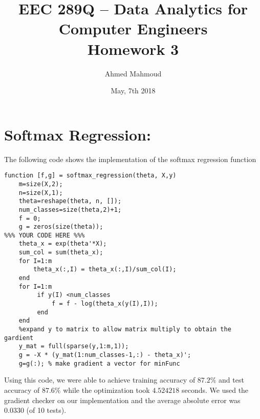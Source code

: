 \documentclass[12pt] {article}
\begin{document}
\title{EEC 289Q – Data Analytics for Computer Engineers \\ Homework 3}
\author{Ahmed Mahmoud}
\date{May, 7th 2018} 

\maketitle






\section*{Softmax Regression:} 
The following code shows the implementation of the softmax regression function
\begin{lstlisting}
function [f,g] = softmax_regression(theta, X,y) 
	m=size(X,2);
	n=size(X,1);
	theta=reshape(theta, n, []);
	num_classes=size(theta,2)+1;
	f = 0;
	g = zeros(size(theta));
%%% YOUR CODE HERE %%%
	theta_x = exp(theta'*X);
	sum_col = sum(theta_x);
	for I=1:m
    	theta_x(:,I) = theta_x(:,I)/sum_col(I);
	end
	for I=1:m
    	 if y(I) <num_classes
        	 f = f - log(theta_x(y(I),I));
	     end
	end
	%expand y to matrix to allow matrix multiply to obtain the gardient 
	y_mat = full(sparse(y,1:m,1));
	g = -X * (y_mat(1:num_classes-1,:) - theta_x)';
	g=g(:); % make gradient a vector for minFunc
\end{lstlisting}

Using this code, we were able to achieve training accuracy of $87.2\%$ and 
test accuracy of $87.6\%$ while the optimization took $4.524218 $ seconds. We used the gradient checker on our implementation and the average absolute error was $0.0330$ (of 10 tests).
\end{document}
